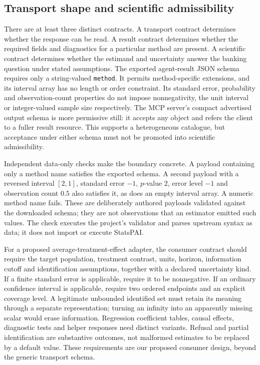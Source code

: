 \subsection{Transport shape and scientific admissibility}
\label{exec23:statspai-contract-schema}
There are at least three distinct contracts. A transport contract determines
whether the response can be read. A result contract determines whether the
required fields and diagnostics for a particular method are present. A
scientific contract determines whether the estimand and uncertainty answer the
banking question under stated assumptions. The exported agent-result JSON
schema requires only a string-valued \texttt{method}. It permits method-specific
extensions, and its interval array has no length or order constraint. Its
standard error, probability and observation-count properties do not impose
nonnegativity, the unit interval or integer-valued sample size respectively.
The MCP server's compact advertised output schema is more permissive still:
it accepts any object and refers the client to a fuller result resource.
This supports a heterogeneous catalogue, but acceptance under either schema
must not be promoted into scientific admissibility.
\citep{exec23_statspai_contract}

Independent data-only checks make the boundary concrete. A payload containing
only a method name satisfies the exported schema. A second payload with a
reversed interval $[2,1]$, standard error $-1$, $p$-value $2$, error level $-1$
and observation count $0.5$ also satisfies it, as does an empty interval array.
A numeric method name fails. These are deliberately authored payloads validated
against the downloaded schema; they are not observations that an estimator
emitted such values. The check executes the project's validator and parses
upstream syntax as data; it does not import or execute StatsPAI.
\citep{exec23_statspai_contract_reference}

For a proposed average-treatment-effect adapter, the consumer contract should
require the target population, treatment contrast, units, horizon, information
cutoff and identification assumptions, together with a declared uncertainty
kind. If a finite standard error is applicable, require it to be nonnegative.
If an ordinary confidence interval is applicable, require two ordered endpoints
and an explicit coverage level. A legitimate unbounded identified set must
retain its meaning through a separate representation; turning an infinity into
an apparently missing scalar would erase information. Regression coefficient
tables, causal effects, diagnostic tests and helper responses need distinct
variants. Refusal and partial identification are substantive outcomes, not
malformed estimates to be replaced by a default value. These requirements are
our proposed consumer design, beyond the generic transport schema.


